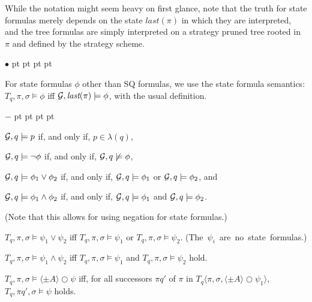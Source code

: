 \documentclass{llncs}
\newcommand{\calg}{{\cal G}}
\newcommand{\emlast}{\textit{last}}
\newcommand{\nxt}{\bigcirc}
\newenvironment{list1}{\begin{list}{$\bullet$}
{\topsep 0 pt \parsep 0 pt \partopsep 0 pt \itemsep 0 pt}}{\end{list}}
\newenvironment{list2}{\begin{list}{$-$}
{\topsep 0 pt \parsep 0 pt \partopsep 0 pt \itemsep 0 pt}}{\end{list}}
\begin{document}
While the notation might seem heavy on first glance, note that the truth for state formulas merely depends on the state $\emlast(\pi)$ in which they are interpreted, and the tree formulas are simply interpreted on a strategy pruned tree rooted in $\pi$ and defined by the strategy scheme.
\begin{list1}
\item For state formulas $\phi$ other than SQ formulas,
  we use the state formula semantics:
$T_q,\pi,\sigma\models \phi$ iff $\calg,\emlast(\pi) \models \phi$, 
with the usual definition.  
\begin{list2}
\item  $\calg,q \models p$ if, and only if, $p\in\lambda(q)$,
\item  $\calg,q \models \neg \phi$ if, and only if, $\calg,q \not\models \phi$,
\item  $\calg,q \models \phi_1 \vee \phi_2$ if, and only if, $\calg,q \models \phi_1$ or $\calg,q \models \phi_2$, and
\item  $\calg,q \models \phi_1 \wedge \phi_2$ if, and only if, $\calg,q \models \phi_1$ and $\calg,q \models \phi_2$.
\end{list2}
(Note that this allows for using negation for state formulas.)

\item $T_q,\pi,\sigma \models \psi_1\vee\psi_2$ iff
    $T_q,\pi,\sigma \models \psi_1$
    or $T_q,\pi,\sigma \models \psi_2$.
     \mbox{(The $\psi_i$ are no state formulas.)}
\item $T_q,\pi,\sigma\models \psi_1\wedge\psi_2$ iff
    $T_q,\pi,\sigma\models \psi_1$
    and $T_q,\pi,\sigma\models \psi_2$ hold.
    
\item $T_q,\pi,\sigma\models \langle \pm A \rangle \nxt \psi$ iff,
     for all successors $\pi q'$ of $\pi$ 
     in $T_q\langle \pi,\sigma,\langle \pm A \rangle\nxt\psi_1\rangle$, 
     $T_q,\pi q',\sigma \models \psi$ holds.  
    

\end{list1}
\end{document}
